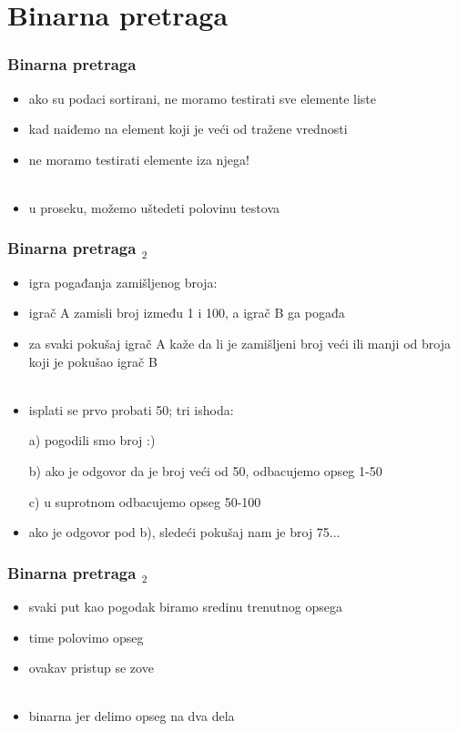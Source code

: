 \documentclass[utf8,compress]{beamer}
\begin{document}
\section[Binarna]{Binarna pretraga}

\begin{frame}[fragile]
  \frametitle{Binarna pretraga}
  \begin{itemize}
    \item ako su podaci sortirani, ne moramo testirati sve elemente liste
    \item kad naiđemo na element koji je veći od tražene vrednosti
    \item ne moramo testirati elemente iza njega! \\ \ \\
    \item u proseku, možemo uštedeti polovinu testova
  \end{itemize}
\end{frame}

\begin{frame}[fragile]
  \frametitle{Binarna pretraga $_2$}
  \begin{itemize}
    \item igra pogađanja zamišljenog broja:
    \item igrač A zamisli broj između 1 i 100, a igrač B ga pogađa
    \item za svaki pokušaj igrač A kaže da li je zamišljeni broj veći 
      ili manji od broja koji je pokušao igrač B \\ \ \\
    \item isplati se prvo probati 50; tri ishoda:
    \item[a)] pogodili smo broj :)
    \item[b)] ako je odgovor da je broj veći od 50, odbacujemo opseg 1-50
    \item[c)] u suprotnom odbacujemo opseg 50-100
    \item ako je odgovor pod b), sledeći pokušaj nam je broj 75...
  \end{itemize}
\end{frame}

\begin{frame}[fragile]
  \frametitle{Binarna pretraga $_2$}
  \begin{itemize}
    \item svaki put kao pogodak biramo sredinu trenutnog opsega
    \item time polovimo opseg
    \item ovakav pristup se zove  \\ \ \\
    \item binarna jer delimo opseg na dva dela
  \end{itemize}
\end{frame}
\end{document}
